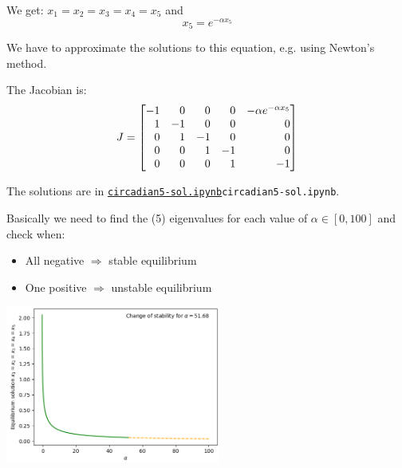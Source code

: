 \begin{solution}

\begin{slide}

\begin{parts}
	\item We get: $x_1 = x_2 = x_3 = x_4 = x_5$ and
	\[ x_5 = e^{-\alpha x_5} \]
	
	We have to approximate the solutions to this equation, e.g. using Newton's method.
	
	\item The Jacobian is:
		\[ J = 
			\mat { 	-1 & 0 & 0 & 0 & -\alpha e^{-\alpha x_5} \\
					1 & -1 & 0 & 0 & 0 \\
					0 & 1 & -1 & 0 &  0 \\
					0 & 0 & 1 & -1 &  0 \\
					0 & 0 & 0 & 1 & -1 
					}
		\]	
	\item The solutions are in \href{https://utoronto.syzygy.ca/jupyter/user-redirect/git-pull?repo=https://github.com/bigfatbernie/IBLMathModeling&subPath=book/python/circadian.ipynb}{\tt circadian5-sol.ipynb}{\tt circadian5-sol.ipynb}.
	
	Basically we need to find the (5) eigenvalues for each value of $\alpha \in [0,100]$ and check when:
	\begin{itemize}
		\item All negative $\Rightarrow $ stable equilibrium
		\item One positive $\Rightarrow $ unstable equilibrium
	\end{itemize}
	
	\includegraphics[width=200pt]{images/circadian5.png}
	
\end{parts}
	
\end{slide}	
\end{solution}



